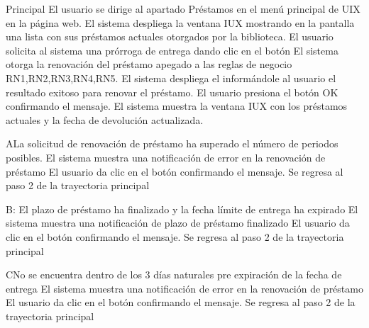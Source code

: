 	\begin{UCtrayectoria}{Principal}
		\UCpaso[\UCactor] El usuario se dirige al apartado Préstamos en el menú principal de UIX en la página web.  
		\UCpaso[\UCsist]El sistema despliega la ventana IUX mostrando en la pantalla una lista con sus préstamos actuales otorgados por la biblioteca.
				\UCpaso[\UCactor] El usuario solicita al sistema una prórroga de entrega  dando clic en el botón 
						\UCpaso[\UCsist]El sistema otorga la renovación del préstamo apegado a las reglas de negocio RN1,RN2,RN3,RN4,RN5.   \Trayref{C}   
		\UCpaso[\UCsist] El sistema despliega el  informándole al usuario el resultado exitoso para renovar el préstamo.
				\UCpaso[\UCactor]El usuario presiona el botón OK confirmando el mensaje.
				\UCpaso[\UCsist]El sistema muestra la ventana IUX con los préstamos actuales y la fecha de devolución actualizada.
	\end{UCtrayectoria}
		\begin{UCtrayectoriaA}{A}{La solicitud de renovación de préstamo ha superado el número de periodos posibles.}
			\UCpaso[\UCsist]El sistema muestra una notificación de error en la renovación de préstamo 
			\UCpaso[\UCactor] El usuario da clic en el botón  confirmando el mensaje. 
			\UCpaso[\UCsist] Se regresa al paso 2 de la trayectoria principal 
		\end{UCtrayectoriaA}

		\begin{UCtrayectoriaA}{B}{: El plazo de préstamo ha finalizado y la fecha límite de entrega ha expirado}
			\UCpaso[\UCsist]El sistema muestra una notificación de plazo de préstamo finalizado 
			\UCpaso[\UCactor] El usuario da clic en el botón  confirmando el mensaje. 
			\UCpaso[\UCsist] Se regresa al paso 2 de la trayectoria principal 
		\end{UCtrayectoriaA}
		
				\begin{UCtrayectoriaA}{C}{No se encuentra dentro de los 3 días naturales pre expiración de la fecha de entrega}
			\UCpaso[\UCsist]El sistema muestra una notificación de error en la renovación de préstamo 
			\UCpaso[\UCactor] El usuario da clic en el botón  confirmando el mensaje. 
			\UCpaso[\UCsist] Se regresa al paso 2 de la trayectoria principal 
		\end{UCtrayectoriaA}
		
